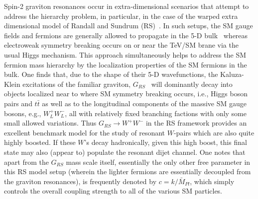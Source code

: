 Spin-2 graviton resonances occur in extra-dimensional scenarios that attempt to address the hierarchy problem, in particular, in the case of the warped extra dimensional model of 
Randall and Sundrum (RS)~\cite{Randall:1999ee}. In such setups, the SM gauge fields and fermions are generally allowed to propagate in the 5-D 
bulk~\cite{Pomarol:1999ad,Davoudiasl:1999tf,Grossman:1999ra,Davoudiasl:2000wi,Gherghetta:2000qt} whereas electroweak symmetry breaking occurs on or near the TeV/SM brane 
via the usual Higgs mechanism. This approach simultaneously helps to address the SM fermion mass hierarchy by the localization properties of the SM fermions in the bulk. 
One finds that, due to the shape of their 5-D wavefunctions, the Kaluza-Klein excitations of the familiar graviton, $G_{RS}$~\cite{Davoudiasl:1999jd} will dominantly decay into 
objects localized near to where SM symmetry breaking occurs, i.e., Higgs boson pairs and $t\bar t$ as well as to the longitudinal components of the massive SM gauge bosons, e.g., 
$W^+_L W^-_L$, all with relatively fixed branching factions with only some small allowed variations. Thus $G_{RS}\rightarrow 
W^+W^-$ in the RS framework provides an excellent benchmark model for the study of resonant $W$-pairs which are also quite highly boosted. If these $W$'s decay hadronically, 
given this high boost, this final state may also (appear to) populate the resonant dijet channel. One notes that apart from the $G_{RS}$ mass scale itself, essentially the only other 
free parameter in this RS model setup (wherein the lighter fermions are essentially decoupled from the graviton resonances), is frequently denoted by $c=k/\bar M_{Pl}$, which simply 
controls the overall coupling strength to all of the various SM particles. 







